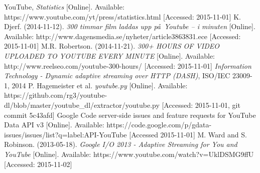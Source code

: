 \begin{thebibliography}{5}
    \footnotesize
		YouTube,
		\textit{Statistics}
		[Online].
		Available:
		https://www.youtube.com/yt/press/statistics.html
		[Accessed: 2015-11-01]
		K. Djerf.
		(2014-11-12).
		\textit{300 timmar film laddas upp p\aa\  Youtube – i minuten}
		[Online].
		Available:
		http://www.dagensmedia.se/nyheter/article3863831.ece
		[Accessed: 2015-11-01]
		M.R. Robertson.
		(2014-11-21).
		\textit{300+ HOURS OF VIDEO UPLOADED TO YOUTUBE EVERY MINUTE}
		[Online].
		Available:
		http://www.reelseo.com/youtube-300-hours/
		[Accessed: 2015-11-01]
		\textit{Information Technology - Dynamic adaptive streaming over HTTP (DASH)},
		ISO/IEC 23009-1, 2014
		P. Hagemeister et al.
		\textit{youtube.py}
		[Online].
		Available:
		https://github.com/rg3/youtube-dl/blob/master/youtube\_dl/extractor/youtube.py
		[Accessed: 2015-11-01, git commit 5c43afd]
		Google Code server-side issues and feature requests for YouTube Data API v3
		[Online].
		Available:
		https://code.google.com/p/gdata-issues/issues/list?q=label:API-YouTube
		[Accessed 2015-11-01]
        M. Ward and S. Robinson.
        (2013-05-18).
        \textit{Google I/O 2013 - Adaptive Streaming for You and YouTube}
        [Online].
        Available:
        https://www.youtube.com/watch?v=UklDSMG9ffU
        [Accessed: 2015-11-02]
\end{thebibliography}
